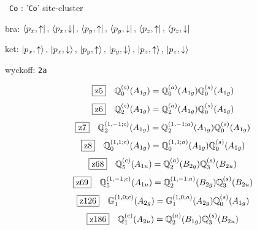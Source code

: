 \documentclass[fleqn,10pt,landscape]{jsarticle}
\begin{document}
\noindent\textbullet\, \texttt{Co} : '\texttt{Co}' site-cluster

\noindent\quad * bra: $\bra{p_{x},\uparrow},\, \bra{p_{x},\downarrow},\, \bra{p_{y},\uparrow},\, \bra{p_{y},\downarrow},\, \bra{p_{z},\uparrow},\, \bra{p_{z},\downarrow}$

\noindent\quad * ket: $\ket{p_{x},\uparrow},\, \ket{p_{x},\downarrow},\, \ket{p_{y},\uparrow},\, \ket{p_{y},\downarrow},\, \ket{p_{z},\uparrow},\, \ket{p_{z},\downarrow}$

\noindent\quad * wyckoff: \texttt{2a}

\begin{dmath*}
\hspace*{3mm}\fbox{z5}\quad \mathbb{Q}_{0}^{(c)}(A_{1g})=\mathbb{Q}_{0}^{(a)}(A_{1g}) \mathbb{Q}_{0}^{(s)}(A_{1g})
\end{dmath*}
\begin{dmath*}
\hspace*{3mm}\fbox{z6}\quad \mathbb{Q}_{2}^{(c)}(A_{1g})=\mathbb{Q}_{2}^{(a)}(A_{1g}) \mathbb{Q}_{0}^{(s)}(A_{1g})
\end{dmath*}
\begin{dmath*}
\hspace*{3mm}\fbox{z7}\quad \mathbb{Q}_{2}^{(1,-1;c)}(A_{1g})=\mathbb{Q}_{2}^{(1,-1;a)}(A_{1g}) \mathbb{Q}_{0}^{(s)}(A_{1g})
\end{dmath*}
\begin{dmath*}
\hspace*{3mm}\fbox{z8}\quad \mathbb{Q}_{0}^{(1,1;c)}(A_{1g})=\mathbb{Q}_{0}^{(1,1;a)}(A_{1g}) \mathbb{Q}_{0}^{(s)}(A_{1g})
\end{dmath*}
\begin{dmath*}
\hspace*{3mm}\fbox{z68}\quad \mathbb{Q}_{5}^{(c)}(A_{1u})=\mathbb{Q}_{2}^{(a)}(B_{2g}) \mathbb{Q}_{3}^{(s)}(B_{2u})
\end{dmath*}
\begin{dmath*}
\hspace*{3mm}\fbox{z69}\quad \mathbb{Q}_{5}^{(1,-1;c)}(A_{1u})=\mathbb{Q}_{2}^{(1,-1;a)}(B_{2g}) \mathbb{Q}_{3}^{(s)}(B_{2u})
\end{dmath*}
\begin{dmath*}
\hspace*{3mm}\fbox{z126}\quad \mathbb{G}_{1}^{(1,0;c)}(A_{2g})=\mathbb{G}_{1}^{(1,0;a)}(A_{2g}) \mathbb{Q}_{0}^{(s)}(A_{1g})
\end{dmath*}
\begin{dmath*}
\hspace*{3mm}\fbox{z186}\quad \mathbb{Q}_{1}^{(c)}(A_{2u})=\mathbb{Q}_{2}^{(a)}(B_{1g}) \mathbb{Q}_{3}^{(s)}(B_{2u})
\end{dmath*}
\end{document}
